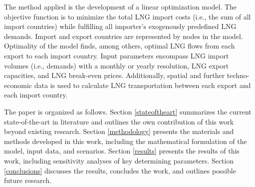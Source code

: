 The method applied is the development of a linear optimization model. The objective function is to minimize the total LNG import costs (i.e., the sum of all import countries) while fulfilling all importer's exogenously predefined LNG demands. Import and export countries are represented by nodes in the model. Optimality of the model finds, among others, optimal LNG flows from each export to each import country. Input parameters encompass LNG import volumes (i.e., demands) with a monthly or yearly resolution, LNG export capacities, and LNG break-even prices. Additionally, spatial and further techno-economic data is used to calculate LNG transportation between each export and each import country.\vspace{0.35cm}   

The paper is organized as follows. Section \ref{stateoftheart} summarizes the current state-of-the-art in literature and outlines the own contribution of this work beyond existing research. Section \ref{methodology} presents the materials and methods developed in this work, including the mathematical formulation of the model, input data, and scenarios. Section \ref{results} presents the results of this work, including sensitivity analyses of key determining parameters. Section \ref{conclusions} discusses the results, concludes the work, and outlines possible future research.






